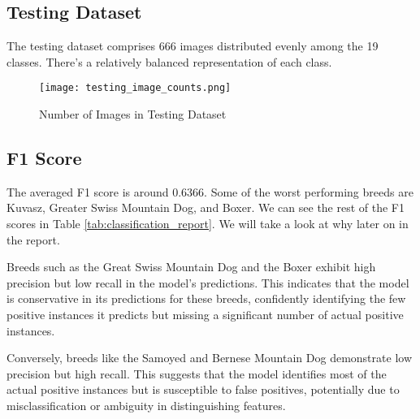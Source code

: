 \documentclass[11pt]{article}
\begin{document}
\subsection{Testing Dataset}

The testing dataset comprises 666 images distributed evenly among the 19 classes. There's a relatively balanced representation of each class.

\begin{figure}[h]
    \centering
    \texttt{[image: testing\_image\_counts.png]}
    \caption{\label{fig:testing_img}Number of Images in Testing Dataset }
\end{figure}

\newpage

\subsection{F1 Score}

The averaged F1 score is around 0.6366. Some of the worst performing breeds are Kuvasz, Greater Swiss Mountain Dog, and Boxer. We can see the rest of the F1 scores in Table \ref{tab:classification_report}. We will take a look at why later on in the report.     

Breeds such as the Great Swiss Mountain Dog and the Boxer exhibit high precision but low recall in the model's predictions. This indicates that the model is conservative in its predictions for these breeds, confidently identifying the few positive instances it predicts but missing a significant number of actual positive instances.

Conversely, breeds like the Samoyed and Bernese Mountain Dog demonstrate low precision but high recall. This suggests that the model identifies most of the actual positive instances but is susceptible to false positives, potentially due to misclassification or ambiguity in distinguishing features.
\end{document}
